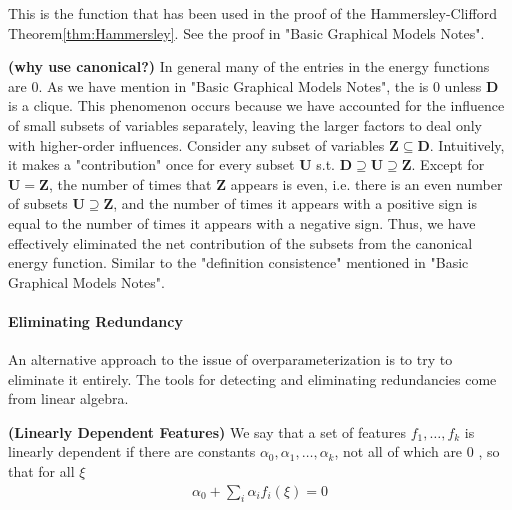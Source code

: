 \documentclass{article}
\newcommand{\bfs}[1]{\textbf{({#1}) }}
\begin{document}
This is the function that has been used in the proof of the Hammersley-Clifford Theorem\cref{thm:Hammersley}.  See the proof in "Basic Graphical Models Notes".
\begin{rema}\bfs{why use canonical?}
In general many of the entries in the energy functions are $0$. As we have mention in "Basic Graphical Models Notes", the  is $0$ unless $\boldsymbol{D}$ is a clique. This phenomenon occurs because we have accounted for the influence of small subsets of variables separately, leaving the larger factors to deal only with higher-order influences. Consider any subset of variables $\boldsymbol{Z}\subseteq\boldsymbol{D}$. Intuitively, it makes a "contribution" once for every subset $\boldsymbol{U}$ s.t. $\boldsymbol{D} \supseteq\boldsymbol{U} \supseteq \boldsymbol{Z}$. Except for $\boldsymbol{U}=\boldsymbol{Z}$, the number of times that $\boldsymbol{Z}$ appears is even, i.e. there is an even number of subsets $\boldsymbol{U} \supseteq \boldsymbol{Z}$, and the number of times it appears with a positive sign is equal to the number of times it appears with a negative sign. Thus, we have effectively eliminated the net contribution of the subsets from the canonical energy function. Similar to the "definition consistence" mentioned in "Basic Graphical Models Notes".
\end{rema}
\paragraph{Eliminating Redundancy}
An alternative approach to the issue of overparameterization is to try to eliminate it entirely. The tools for detecting and eliminating redundancies come from linear algebra.
\begin{defa}\bfs{Linearly Dependent Features}
We say that a set of features $f_{1}, \ldots, f_{k}$ is linearly dependent if there are constants $\alpha_{0}, \alpha_{1}, \ldots, \alpha_{k}$, not all of which are 0 , so that for all $\xi$
\begin{align*}
\alpha_{0}+\sum_{i} \alpha_{i} f_{i}(\xi)=0
\end{align*}
\end{defa}
\end{document}
